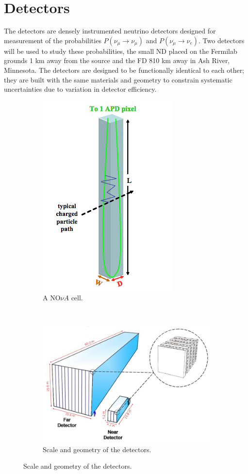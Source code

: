 \section{\nova Detectors}
\label{sec:detectors}
The \nova detectors are densely instrumented neutrino detectors designed for measurement of the probabilities $P(\nu_\mu \rightarrow \nu_\mu)$ and $P(\nu_\mu \rightarrow \nu_e)$.  Two detectors will be used to study these probabilities, the small ND placed on the Fermilab grounds 1 km away from the \numi source and the FD 810 km away in Ash River, Minnesota.  The detectors are designed to be functionally identical to each other; they are built with the same materials and geometry to constrain systematic uncertainties due to variation in detector efficiency. 

\begin{figure}[t]
\begin{subfigure}[t]{0.25\textwidth}
                \includegraphics[height=0.35\textheight]{figures/figures/cell.png}
               \caption{A NO$\nu A$ cell.}
                 \label{cell}
        \end{subfigure}
        ~
\begin{subfigure}[t]{0.75\textwidth}
                \centering
                \includegraphics[height=0.35\textheight]{figures/figures/detectors.png}
               \caption{Scale and geometry of the \nova detectors.}
                \label{detector}


\end{subfigure}
\end{figure}

